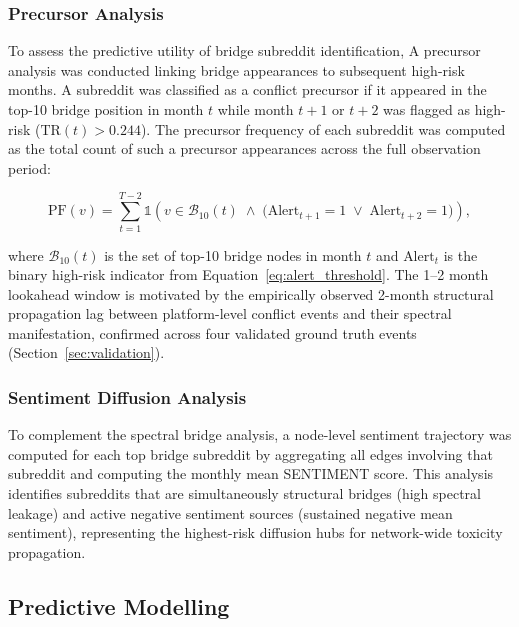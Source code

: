 \documentclass[a4paper,fleqn]{cas-dc}
\begin{document}
\subsubsection{Precursor Analysis}
\label{subsec:precursor_analysis}

To assess the predictive utility of bridge subreddit identification,
A precursor analysis was conducted linking bridge appearances to
subsequent high-risk months. A subreddit was classified as a
conflict precursor if it appeared in the top-10 bridge
position in month $t$ while month $t{+}1$ or $t{+}2$ was flagged as
high-risk ($\text{TR}(t) > 0.244$). The precursor frequency
of each subreddit was computed as the total count of such a precursor
appearances across the full observation period:

\begin{equation}
\label{eq:precursor_freq}
\text{PF}(v) = \sum_{t=1}^{T-2}
\mathbb{1}\!\left( v \in \mathcal{B}_{10}(t) \;\wedge\;
\bigl(\text{Alert}_{t+1} = 1 \;\vee\; \text{Alert}_{t+2} = 1\bigr)
\right),
\end{equation}

where $\mathcal{B}_{10}(t)$ is the set of top-10 bridge nodes in
month $t$ and $\text{Alert}_t$ is the binary high-risk indicator from
Equation~\ref{eq:alert_threshold}. The 1--2 month lookahead window is
motivated by the empirically observed 2-month structural propagation
lag between platform-level conflict events and their spectral
manifestation, confirmed across four validated ground truth events
(Section~\ref{sec:validation}).

\subsubsection{Sentiment Diffusion Analysis}
\label{subsec:sentiment_diffusion}

To complement the spectral bridge analysis, a node-level sentiment
trajectory was computed for each top bridge subreddit by aggregating
all edges involving that subreddit and computing the monthly mean
SENTIMENT score. This analysis identifies subreddits that are
simultaneously structural bridges (high spectral leakage) and active
negative sentiment sources (sustained negative mean sentiment),
representing the highest-risk diffusion hubs for network-wide
toxicity propagation.

\subsection{Predictive Modelling}
\label{sec:predictive_model}
\end{document}
